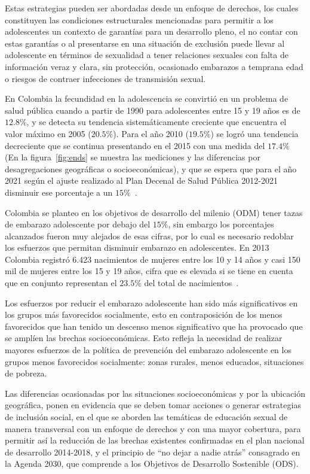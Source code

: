 \documentclass[a4paper]{article}
\begin{document}
Estas estrategias pueden ser abordadas desde un enfoque de derechos, los cuales constituyen las condiciones estructurales mencionadas para permitir a los adolescentes un contexto de garantías para un desarrollo pleno, el no contar con estas garantías o al presentarse en una situación de exclusión puede llevar al adolescente en términos de sexualidad a tener relaciones sexuales con falta de información veraz y clara, sin protección, ocasionado embarazos a temprana edad o riesgos de contraer infecciones de transmisión sexual. 

En Colombia la  fecundidad  en  la  adolescencia  se  convirtió  en  un problema de salud pública cuando a partir de 1990 para adolescentes entre 15 y 19 años es de $12.8\%$, y se  detecta  su  tendencia  sistemáticamente  creciente  que encuentra  el  valor  máximo  en  2005 ($20.5\%$). Para el año 2010 ($19.5\%$) se logró una tendencia decreciente que se continua presentando en el 2015 con una medida del $17.4\%$ (En la figura~\ref{fig:ends} se muestra las mediciones y las diferencias por desagregaciones geográficas o socioeconómicas), y que se espera que para el año 2021 según el ajuste realizado al Plan Decenal de Salud Pública 2012-2021 disminuir ese porcentaje a un $15\%$~\citep{Pro2015}.

Colombia se planteo en los objetivos de desarrollo del milenio (ODM) tener tazas de embarazo adolescente por debajo del $15\%$, sin embargo los porcentajes alcanzados fueron muy alejados de esas cifras, por lo cual es necesario redoblar los esfuerzos que permitan disminuir embarazo en adolescentes. En 2013 Colombia registró 6.423 nacimientos de mujeres entre los 10 y 14 años y casi 150 mil de mujeres entre los 15 y 19 años, cifra que es elevada si se tiene en cuenta que en conjunto representan el $23.5\%$ del total de nacimientos~\citep{PNUD2015}.

Los esfuerzos por reducir el embarazo adolescente han sido más significativos en los grupos más favorecidos socialmente, esto en contraposición de los menos favorecidos que han tenido un descenso menos significativo que ha provocado que se amplíen las brechas socioeconómicas. Esto refleja la  necesidad de realizar mayores esfuerzos de la política de prevención del embarazo adolescente en los grupos menos favorecidos socialmente: zonas rurales, menos educados, situaciones de pobreza. 

Las diferencias ocasionadas por las situaciones socioeconómicas y por la ubicación geográfica, ponen en evidencia que se deben tomar acciones o generar estrategias de inclusión social, en el que se aborden las temáticas de educación sexual de manera transversal con un enfoque de derechos y con una mayor cobertura, para permitir así la reducción de las brechas existentes confirmadas en el plan nacional de desarrollo 2014-2018, y  el  principio  de  “no  dejar  a  nadie  atrás”  consagrado  en  la  Agenda  2030,  que  comprende a los Objetivos de Desarrollo Sostenible (ODS).
	
\end{document}
